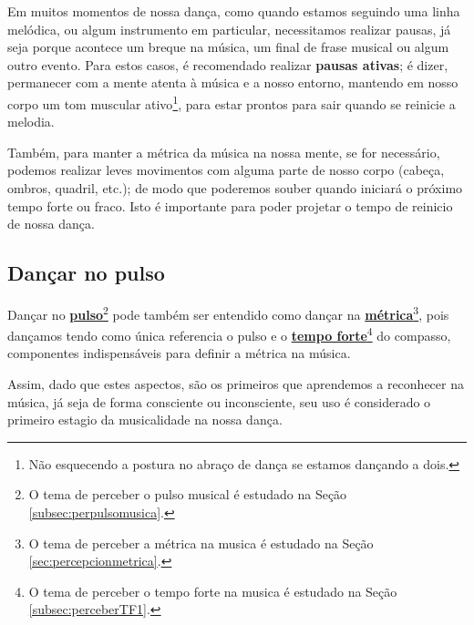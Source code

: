 \begin{elaboracion}[title=Pausa ativa, width= 1.0\linewidth]
\label{ref:pausaativa}
Em muitos momentos de nossa dança, como quando estamos seguindo uma linha melódica,
ou algum instrumento em particular, necessitamos realizar pausas, 
já seja porque acontece um breque na música, um final de frase musical ou algum outro evento.
Para estos casos, é recomendado realizar \textbf{pausas ativas}; é dizer,
permanecer com a mente atenta à música e a nosso entorno, 
mantendo em nosso corpo um tom muscular ativo\footnote{Não 
esquecendo a postura no abraço de dança se estamos dançando a dois. }, 
para estar prontos para sair quando se reinicie a melodia.

Também, para manter a métrica da música na nossa mente,
se for necessário, 
podemos realizar leves movimentos com alguma parte de nosso corpo (cabeça, ombros, quadril, etc.);  
de modo que poderemos souber quando iniciará o próximo tempo forte ou fraco.
Isto é importante para poder projetar o tempo de reinicio de nossa dança.
\end{elaboracion}


\subsection{Dançar no pulso}
\label{subsec:dancapulso}
Dançar no \hyperref[subsec:perpulsomusica]{\textbf{pulso}}\footnote{O 
tema de perceber o pulso musical é estudado na Seção \ref{subsec:perpulsomusica}.} 
pode também ser entendido como dançar na 
\hyperref[sec:percepcionmetrica]{\textbf{métrica}}\footnote{O 
tema de perceber a métrica na musica é estudado na Seção 
\ref{sec:percepcionmetrica}.},
pois dançamos tendo como única referencia o pulso
e o \hyperref[subsec:perceberTF1]{\textbf{tempo forte}}\footnote{O 
tema de perceber o tempo forte na musica é estudado na Seção 
\ref{subsec:perceberTF1}.} do compasso,
componentes indispensáveis para definir a métrica na música.

Assim, dado que estes aspectos, 
são os primeiros que aprendemos a reconhecer na música,
já seja de forma consciente ou inconsciente,
seu uso é considerado o primeiro estagio da musicalidade na nossa dança.
 
